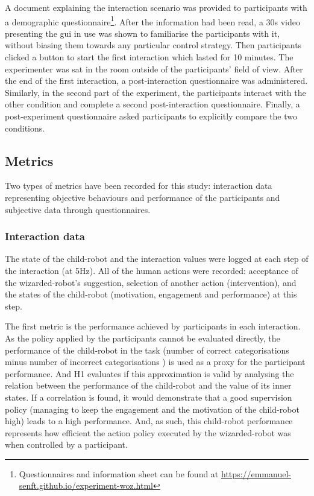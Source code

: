 A document explaining the interaction scenario was provided to participants with a demographic questionnaire\footnote{Questionnaires and information sheet can be found at \url{https://emmanuel-senft.github.io/experiment-woz.html}}. After the information had been read, a 30s video presenting the \gls{gui} in use was shown to familiarise the participants with it, without biasing them towards any particular control strategy. Then participants clicked a button to start the first interaction which lasted for 10 minutes. The experimenter was sat in the room outside of the participants' field of view. After the end of the first interaction, a post-interaction questionnaire was administered. Similarly, in the second part of the experiment, the participants interact with the other condition and complete a second post-interaction questionnaire. Finally, a post-experiment questionnaire asked participants to explicitly compare the two conditions.

\subsection{Metrics}

Two types of metrics have been recorded for this study: interaction data representing objective behaviours and performance of the participants and subjective data through questionnaires.

\subsubsection{Interaction data}

The state of the child-robot and the interaction values were logged at each step of the interaction (at 5Hz). All of the human actions were recorded: acceptance of the wizarded-robot's suggestion, selection of another action (intervention), and the states of the child-robot (motivation, engagement and performance) at this step. 

The first metric is the performance achieved by participants in each interaction. As the policy applied by the participants cannot be evaluated directly, the performance of the child-robot in the task (number of correct categorisations minus number of incorrect categorisations ) is used as a proxy for the participant performance. And H1 evaluates if this approximation is valid by analysing the relation between the performance of the child-robot and the value of its inner states. If a correlation is found, it would demonstrate that a good supervision policy (managing to keep the engagement and the motivation of the child-robot high) leads to a high performance. And, as such, this child-robot performance represents how efficient the action policy executed by the wizarded-robot was when controlled by a participant.

